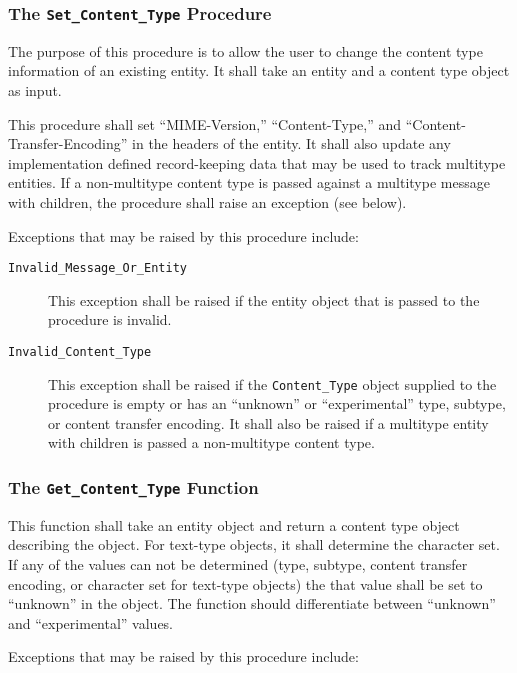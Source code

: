 \documentclass[11pt]{article}
\begin{document}
\subsubsection{The \texttt{Set\_Content\_Type} Procedure}

The purpose of this procedure is to allow the user to change the
content type information of an existing entity. It shall take an
entity and a content type object as input. 

This procedure shall set ``MIME-Version,'' ``Content-Type,'' and
``Content-Transfer-Encoding'' in the headers of the entity. It shall
also update any implementation defined record-keeping data that may be
used to track multitype entities. If a non-multitype content type is
passed against a multitype message with children, the procedure shall
raise an exception (see below).

Exceptions that may be raised by this procedure include:

\begin{description}

\item[\texttt{Invalid\_Message\_Or\_Entity}] This exception shall be
  raised if the entity object that is passed to the procedure is
  invalid.

\item[\texttt{Invalid\_Content\_Type}] This exception shall be raised
  if the \texttt{Content\_Type} object supplied to the procedure is
  empty or has an ``unknown'' or ``experimental'' type, subtype, or
  content transfer encoding. It shall also be raised if a multitype
  entity with children is passed a non-multitype content type.

\end{description}

\subsubsection{The \texttt{Get\_Content\_Type} Function}

This function shall take an entity object and return a content type
object describing the object. For text-type objects, it shall
determine the character set. If any of the values can not be
determined (type, subtype, content transfer encoding, or character set
for text-type objects) the that value shall be set to ``unknown'' in
the object. The function should differentiate between ``unknown'' and
``experimental'' values.

Exceptions that may be raised by this procedure include:
\end{document}
